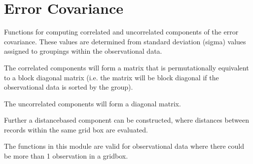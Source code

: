 \documentclass[letterpaper,10pt,english]{sphinxmanual}
\begin{document}
\sphinxstepscope


\chapter{Error Covariance}
\label{\detokenize{error_covariance:module-glomar_gridding.error_covariance}}\label{\detokenize{error_covariance:error-covariance}}\label{\detokenize{error_covariance::doc}}
\sphinxAtStartPar
Functions for computing correlated and uncorrelated components of the error
covariance. These values are determined from standard deviation (sigma) values
assigned to groupings within the observational data.

\sphinxAtStartPar
The correlated components will form a matrix that is permutationally equivalent
to a block diagonal matrix (i.e. the matrix will be block diagonal if the
observational data is sorted by the group).

\sphinxAtStartPar
The uncorrelated components will form a diagonal matrix.

\sphinxAtStartPar
Further a distance\sphinxhyphen{}based component can be constructed, where distances between
records within the same grid box are evaluated.

\sphinxAtStartPar
The functions in this module are valid for observational data where there could
be more than 1 observation in a gridbox.
\end{document}
